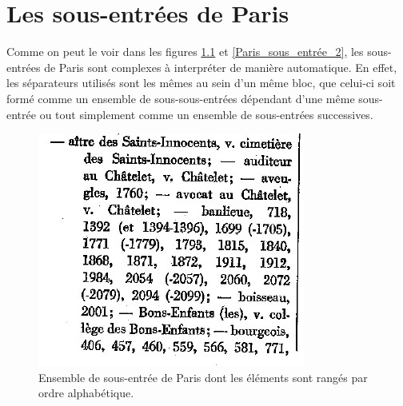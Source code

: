 \documentclass[a4paper,12pt,twoside]{book}
\begin{document}
	\appendix
	\chapter{Les sous-entrées de \og Paris\fg{}}
	
	Comme on peut le voir dans les figures \ref{Paris_sous_entrée_1} et \ref{Paris_sous_entrée_2}, les sous-entrées de Paris sont complexes à interpréter de manière automatique. En effet, les séparateurs utilisés sont les mêmes au sein d'un même bloc, que celui-ci soit formé comme un ensemble de sous-sous-entrées dépendant d'une même sous-entrée ou tout simplement comme un ensemble de sous-entrées successives.
	
	\begin{figure}
		\centering
		\includegraphics[width=\textwidth]{Images/Paris_sous_entrees_1.jpg}
		\caption{Ensemble de sous-entrée de \og Paris\fg{} dont les éléments sont rangés par ordre alphabétique.}
		\label{Paris_sous_entrée_1}
	\end{figure}
\end{document}

